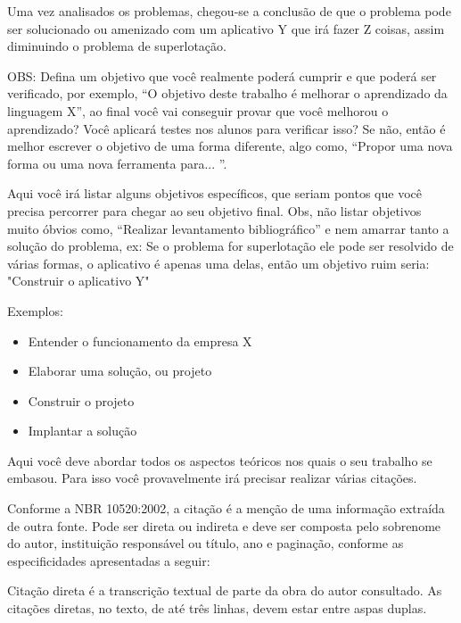 Uma vez analisados os problemas, chegou-se a conclusão de que o problema pode ser solucionado ou amenizado com um aplicativo Y que irá fazer Z coisas, assim diminuindo o problema de superlotação.

OBS: Defina um objetivo que você realmente poderá cumprir e que poderá ser verificado, por exemplo, ``O objetivo deste trabalho é melhorar o aprendizado da linguagem X'', ao final você vai conseguir provar que você melhorou o aprendizado? Você aplicará testes nos alunos para verificar isso? Se não, então é melhor escrever o objetivo de uma forma diferente, algo como, ``Propor uma nova forma ou uma nova ferramenta para... ''.


Aqui você irá listar alguns objetivos específicos, que seriam pontos que você precisa percorrer para chegar ao seu objetivo final. Obs, não listar objetivos muito óbvios como, ``Realizar levantamento bibliográfico'' e nem amarrar tanto  a solução do problema, ex: Se o problema for superlotação ele pode ser resolvido de várias formas, o aplicativo é apenas uma delas, então um objetivo ruim seria: "Construir o aplicativo Y"

Exemplos:

\begin{itemize}
\item Entender o funcionamento da empresa X
\item Elaborar uma solução, ou projeto
\item Construir o projeto
\item Implantar a solução
\end{itemize}




\label{ref_teorico}

Aqui você deve abordar todos os aspectos teóricos nos quais o seu trabalho se embasou. Para isso você provavelmente irá precisar realizar várias citações.


Conforme a NBR 10520:2002, a citação é a menção de uma informação extraída de outra fonte. Pode ser direta ou indireta e deve ser composta pelo
sobrenome do autor, instituição responsável ou título, ano e paginação, conforme as especificidades apresentadas a seguir:

Citação direta é a transcrição textual de parte da obra do autor consultado. As citações diretas, no texto, de até três linhas, devem estar entre aspas duplas.


